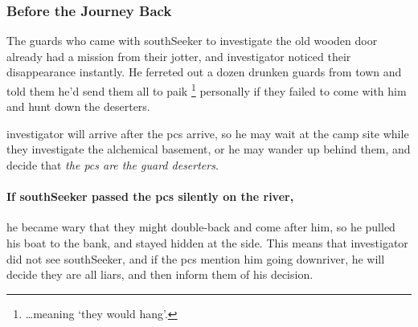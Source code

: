 \subsubsection*{Before the Journey Back}

\begin{exampletext}
  The \glspl{guard} who came with \gls{southSeeker} to investigate the old wooden door already had a mission from their \gls{jotter}, and \gls{investigator} noticed their disappearance instantly.
  He ferreted out a dozen drunken \glspl{guard} from \gls{town} and told them he'd send them all to \gls{paik}%
  \footnote{\ldots meaning `they would hang'.}
  personally if they failed to come with him and hunt down the deserters.

\end{exampletext}

\investigator



\Gls{investigator} will arrive  after the \glspl{pc} arrive, so he may wait at the camp site while they investigate the alchemical basement, or he may wander up behind them, and decide that \emph{the \glspl{pc} are the \gls{guard} deserters}.

\paragraph{If \gls{southSeeker} passed the \glspl{pc} silently on the river,}
he became wary that they might double-back and come after him, so he pulled his boat to the bank, and stayed hidden at the side.
This means that \gls{investigator} did not see \gls{southSeeker}, and if the \glspl{pc} mention him going downriver, he will decide they are all liars, and then inform them of his decision.

